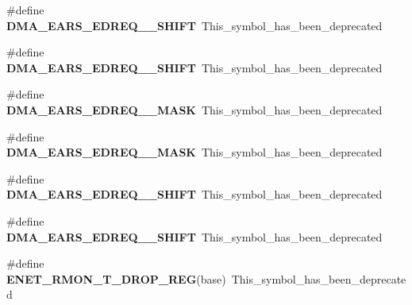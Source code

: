 \begin{DoxyCompactItemize}
\item 
\#define {\bfseries D\+M\+A\+\_\+\+E\+A\+R\+S\+\_\+\+E\+D\+R\+E\+Q\+\_\+\_\+\+S\+H\+I\+FT}~This\+\_\+symbol\+\_\+has\+\_\+been\+\_\+deprecated\hypertarget{group__Backward__Compatibility__Symbols_ga8f665dc1e4a25f3cc4b7f0431c51f6fc}{}\label{group__Backward__Compatibility__Symbols_ga8f665dc1e4a25f3cc4b7f0431c51f6fc}

\item 
\#define {\bfseries D\+M\+A\+\_\+\+E\+A\+R\+S\+\_\+\+E\+D\+R\+E\+Q\+\_\+\_\+\+S\+H\+I\+FT}~This\+\_\+symbol\+\_\+has\+\_\+been\+\_\+deprecated\hypertarget{group__Backward__Compatibility__Symbols_ga8f665dc1e4a25f3cc4b7f0431c51f6fc}{}\label{group__Backward__Compatibility__Symbols_ga8f665dc1e4a25f3cc4b7f0431c51f6fc}

\item 
\#define {\bfseries D\+M\+A\+\_\+\+E\+A\+R\+S\+\_\+\+E\+D\+R\+E\+Q\+\_\+\_\+\+M\+A\+SK}~This\+\_\+symbol\+\_\+has\+\_\+been\+\_\+deprecated\hypertarget{group__Backward__Compatibility__Symbols_ga005e0a088e53af42d5ecff720874670f}{}\label{group__Backward__Compatibility__Symbols_ga005e0a088e53af42d5ecff720874670f}

\item 
\#define {\bfseries D\+M\+A\+\_\+\+E\+A\+R\+S\+\_\+\+E\+D\+R\+E\+Q\+\_\+\_\+\+M\+A\+SK}~This\+\_\+symbol\+\_\+has\+\_\+been\+\_\+deprecated\hypertarget{group__Backward__Compatibility__Symbols_ga005e0a088e53af42d5ecff720874670f}{}\label{group__Backward__Compatibility__Symbols_ga005e0a088e53af42d5ecff720874670f}

\item 
\#define {\bfseries D\+M\+A\+\_\+\+E\+A\+R\+S\+\_\+\+E\+D\+R\+E\+Q\+\_\+\_\+\+S\+H\+I\+FT}~This\+\_\+symbol\+\_\+has\+\_\+been\+\_\+deprecated\hypertarget{group__Backward__Compatibility__Symbols_ga1e80af552cd87f2da888bd74ead17bae}{}\label{group__Backward__Compatibility__Symbols_ga1e80af552cd87f2da888bd74ead17bae}

\item 
\#define {\bfseries D\+M\+A\+\_\+\+E\+A\+R\+S\+\_\+\+E\+D\+R\+E\+Q\+\_\+\_\+\+S\+H\+I\+FT}~This\+\_\+symbol\+\_\+has\+\_\+been\+\_\+deprecated\hypertarget{group__Backward__Compatibility__Symbols_ga1e80af552cd87f2da888bd74ead17bae}{}\label{group__Backward__Compatibility__Symbols_ga1e80af552cd87f2da888bd74ead17bae}

\item 
\#define {\bfseries E\+N\+E\+T\+\_\+\+R\+M\+O\+N\+\_\+\+T\+\_\+\+D\+R\+O\+P\+\_\+\+R\+EG}(base)~This\+\_\+symbol\+\_\+has\+\_\+been\+\_\+deprecated\hypertarget{group__Backward__Compatibility__Symbols_ga4f954021c38e1312f369f2d506e849fb}{}\label{group__Backward__Compatibility__Symbols_ga4f954021c38e1312f369f2d506e849fb}


\end{DoxyCompactItemize}

